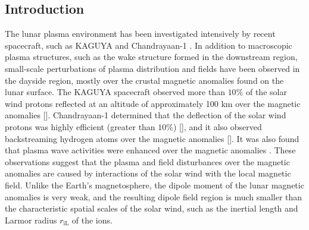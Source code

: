 \documentclass[draft,jgrga]{agutex2015}
\begin{document}
%
%

%

\begin{article}

%
%

\section{Introduction}
The lunar plasma environment has been investigated 
intensively by recent spacecraft,  such as
KAGUYA \citep[e.g.,][]{Saito2008,Saito2010,Saito2012} and
Chandrayaan-1 \citep[e.g.,][]{Barabash2009,Bhardwaj2010}.
In addition to macroscopic plasma structures,
such as the wake structure formed in the downstream region,
small-scale perturbations of plasma distribution and fields have been
 observed in the dayside region,
mostly over the crustal magnetic anomalies found on the lunar surface.
The KAGUYA spacecraft observed
more than $10 \%$ of the solar wind protons reflected at an altitude of approximately 100 km
over the magnetic anomalies [\cite{Saito2010}].
Chandrayaan-1 determined that the deflection of the solar wind protons was highly efficient (greater than $ 10 \%$) [\cite{Lue2011}], and it
also observed backstreaming hydrogen atoms over the magnetic anomalies [\cite{Wieser2010}].
It was also found that
plasma wave activities were enhanced over the magnetic anomalies
\citep[e.g.,][]{Halekas2006a,Hashimoto2010}.
These observations suggest that the plasma and field disturbances over
the magnetic anomalies are caused by interactions of the solar wind with the local magnetic field.
Unlike the Earth's magnetosphere, %
the dipole moment of
the lunar magnetic anomalies is very weak, and
the resulting dipole field region is much smaller than the characteristic spatial scales
of the solar wind, such as the inertial length and Larmor radius $r_\mathrm{iL}$ of the ions.




\end{article}
\end{document}
